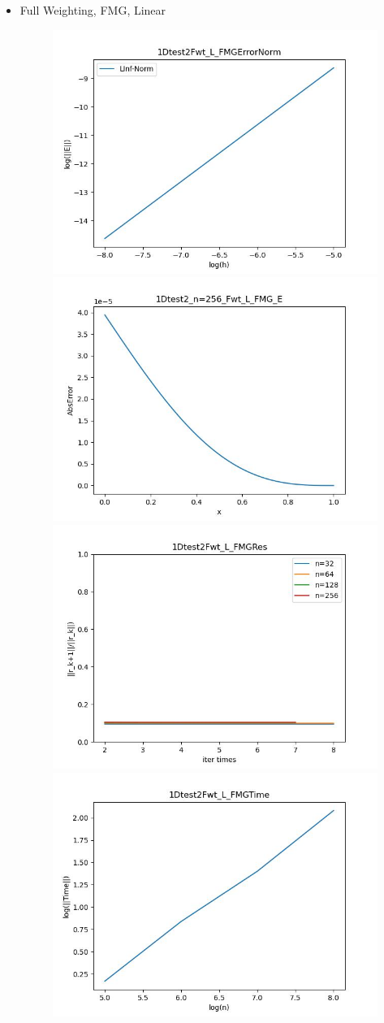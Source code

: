 \documentclass{article}
\begin{document}
\begin{itemize}
    \item Full Weighting, FMG, Linear
    \begin{figure}[h]
        \centering
        \includegraphics[width=0.35\linewidth]{1Dtest2Fwt_L_FMGErrorNorm.jpg}
        \includegraphics[width=0.35\linewidth]{1Dtest2_n=256_Fwt_L_FMG_E.jpg}
        \includegraphics[width=0.35\linewidth]{1Dtest2Fwt_L_FMGRes.jpg}
        \includegraphics[width=0.35\linewidth]{1Dtest2Fwt_L_FMGTime.jpg}
    \end{figure}
    

\end{itemize}
\end{document}
